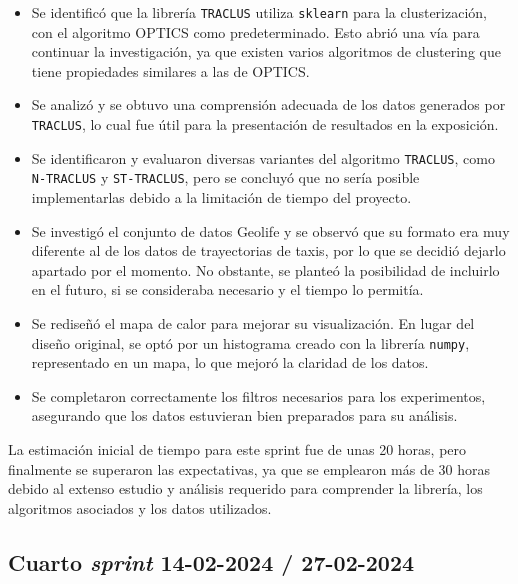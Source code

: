 \begin{itemize}
    \item Se identificó que la librería \texttt{TRACLUS} utiliza \texttt{sklearn} para la clusterización, con el algoritmo OPTICS como predeterminado. Esto abrió una vía para continuar la investigación, ya que existen varios algoritmos de clustering que tiene propiedades similares a las de OPTICS.
    
    \item Se analizó y se obtuvo una comprensión adecuada de los datos generados por \texttt{TRACLUS}, lo cual fue útil para la presentación de resultados en la exposición.
    
    \item Se identificaron y evaluaron diversas variantes del algoritmo \texttt{TRACLUS}, como \texttt{N-TRACLUS} y \texttt{ST-TRACLUS}, pero se concluyó que no sería posible implementarlas debido a la limitación de tiempo del proyecto.
    
    \item Se investigó el conjunto de datos Geolife y se observó que su formato era muy diferente al de los datos de trayectorias de taxis, por lo que se decidió dejarlo apartado por el momento. No obstante, se planteó la posibilidad de incluirlo en el futuro, si se consideraba necesario y el tiempo lo permitía.
    
    \item Se rediseñó el mapa de calor para mejorar su visualización. En lugar del diseño original, se optó por un histograma creado con la librería \texttt{numpy}, representado en un mapa, lo que mejoró la claridad de los datos.
    
    \item Se completaron correctamente los filtros necesarios para los experimentos, asegurando que los datos estuvieran bien preparados para su análisis.
\end{itemize}

La estimación inicial de tiempo para este sprint fue de unas 20 horas, pero finalmente se superaron las expectativas, ya que se emplearon más de 30 horas debido al extenso estudio y análisis requerido para comprender la librería, los algoritmos asociados y los datos utilizados.

\subsection{Cuarto \textit{sprint} 14-02-2024 / 27-02-2024}

